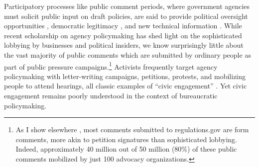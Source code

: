 
Participatory processes like public comment periods, where government agencies must solicit public input on draft policies, are said to provide political oversight opportunities \citep{Balla1998, Mccubbins1984}, democratic legitimacy \citep{Croley2003, Rosenbloom2003}, and new technical information \citep{Yackee2006JPART, Nelson2012}. %
While recent scholarship on agency policymaking has shed light on the sophisticated lobbying by businesses and political insiders, we know surprisingly little about the vast majority of public comments which are submitted by ordinary people as part of public pressure campaigns.\footnote{As I show elsewhere \citep{Judge-Lord2019}, most comments submitted to regulations.gov are form comments, more akin to petition signatures than sophisticated lobbying. Indeed, approximately 40 million out of 50 million (80\%) of these public comments mobilized by just 100 advocacy organizations.}
Activists frequently target agency policymaking with letter-writing campaigns, petitions, protests, and mobilizing people to attend hearings, all classic examples of ``civic engagement'' \citep{Verba1987}. Yet civic engagement remains poorly understood in the context of bureaucratic policymaking.

